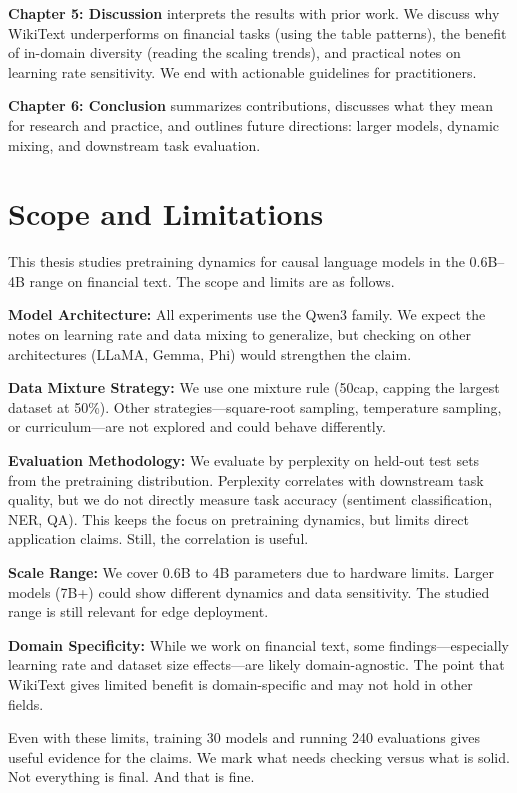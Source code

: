 \textbf{Chapter 5: Discussion} interprets the results with prior work. We discuss why WikiText underperforms on financial tasks (using the table patterns), the benefit of in-domain diversity (reading the scaling trends), and practical notes on learning rate sensitivity. We end with actionable guidelines for practitioners.

\textbf{Chapter 6: Conclusion} summarizes contributions, discusses what they mean for research and practice, and outlines future directions: larger models, dynamic mixing, and downstream task evaluation.

\section{Scope and Limitations}

This thesis studies pretraining dynamics for causal language models in the 0.6B--4B range on financial text. The scope and limits are as follows.

\textbf{Model Architecture:} All experiments use the Qwen3 family. We expect the notes on learning rate and data mixing to generalize, but checking on other architectures (LLaMA, Gemma, Phi) would strengthen the claim.

\textbf{Data Mixture Strategy:} We use one mixture rule (50cap, capping the largest dataset at 50\%). Other strategies—square-root sampling, temperature sampling, or curriculum—are not explored and could behave differently.

\textbf{Evaluation Methodology:} We evaluate by perplexity on held-out test sets from the pretraining distribution. Perplexity correlates with downstream task quality, but we do not directly measure task accuracy (sentiment classification, NER, QA). This keeps the focus on pretraining dynamics, but limits direct application claims. Still, the correlation is useful.

\textbf{Scale Range:} We cover 0.6B to 4B parameters due to hardware limits. Larger models (7B+) could show different dynamics and data sensitivity. The studied range is still relevant for edge deployment.

\textbf{Domain Specificity:} While we work on financial text, some findings—especially learning rate and dataset size effects—are likely domain-agnostic. The point that WikiText gives limited benefit is domain-specific and may not hold in other fields.

Even with these limits, training 30 models and running 240 evaluations gives useful evidence for the claims. We mark what needs checking versus what is solid. Not everything is final. And that is fine.
